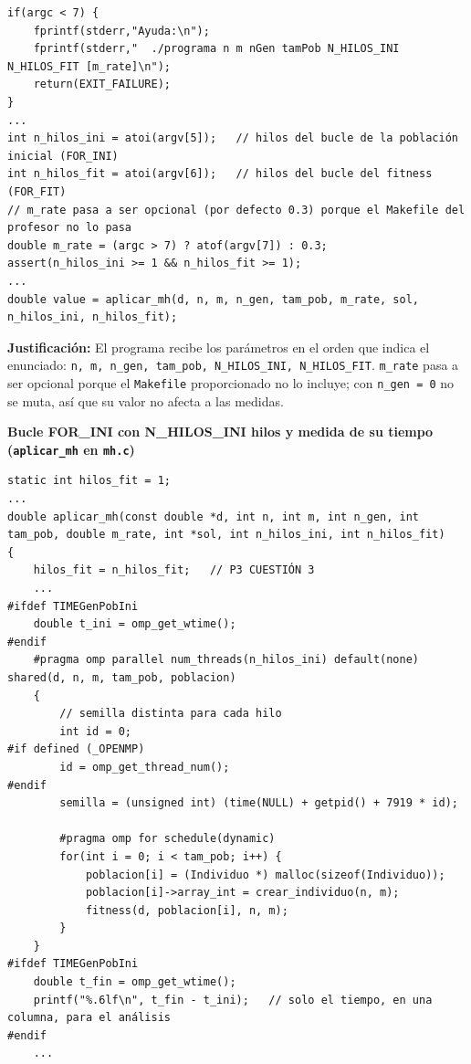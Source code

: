 \documentclass[12pt]{article}
\begin{document}
\begin{enumerate}
\begin{lstlisting}[style=EstiloC]
if(argc < 7) {
	fprintf(stderr,"Ayuda:\n");
	fprintf(stderr,"  ./programa n m nGen tamPob N_HILOS_INI N_HILOS_FIT [m_rate]\n");
	return(EXIT_FAILURE);
}
...
int n_hilos_ini = atoi(argv[5]);   // hilos del bucle de la población inicial (FOR_INI)
int n_hilos_fit = atoi(argv[6]);   // hilos del bucle del fitness (FOR_FIT)
// m_rate pasa a ser opcional (por defecto 0.3) porque el Makefile del profesor no lo pasa
double m_rate = (argc > 7) ? atof(argv[7]) : 0.3;
assert(n_hilos_ini >= 1 && n_hilos_fit >= 1);
...
double value = aplicar_mh(d, n, m, n_gen, tam_pob, m_rate, sol, n_hilos_ini, n_hilos_fit);
\end{lstlisting}

\textbf{Justificación:} El programa recibe los parámetros en el orden que indica el enunciado: \texttt{n, m, n\_gen, tam\_pob, N\_HILOS\_INI, N\_HILOS\_FIT}. \texttt{m\_rate} pasa a ser opcional porque el \texttt{Makefile} proporcionado no lo incluye; con \texttt{n\_gen = 0} no se muta, así que su valor no afecta a las medidas.

\vspace{0.5cm}


\medskip
\noindent\textbf{Bucle FOR\_INI con N\_HILOS\_INI hilos y medida de su tiempo (\texttt{aplicar\_mh} en \texttt{mh.c})}\par
\smallskip

\begin{lstlisting}[style=EstiloC]
static int hilos_fit = 1;
...
double aplicar_mh(const double *d, int n, int m, int n_gen, int tam_pob, double m_rate, int *sol, int n_hilos_ini, int n_hilos_fit)
{
    hilos_fit = n_hilos_fit;   // P3 CUESTIÓN 3
    ...
#ifdef TIMEGenPobIni
    double t_ini = omp_get_wtime();
#endif
    #pragma omp parallel num_threads(n_hilos_ini) default(none) shared(d, n, m, tam_pob, poblacion)
    {
        // semilla distinta para cada hilo
        int id = 0;
#if defined (_OPENMP)
        id = omp_get_thread_num();
#endif
        semilla = (unsigned int) (time(NULL) + getpid() + 7919 * id);

        #pragma omp for schedule(dynamic)
        for(int i = 0; i < tam_pob; i++) {
            poblacion[i] = (Individuo *) malloc(sizeof(Individuo));
            poblacion[i]->array_int = crear_individuo(n, m);
            fitness(d, poblacion[i], n, m);
        }
    }
#ifdef TIMEGenPobIni
    double t_fin = omp_get_wtime();
    printf("%.6lf\n", t_fin - t_ini);   // solo el tiempo, en una columna, para el análisis
#endif
    ...
\end{lstlisting}


\end{enumerate}
\end{document}
